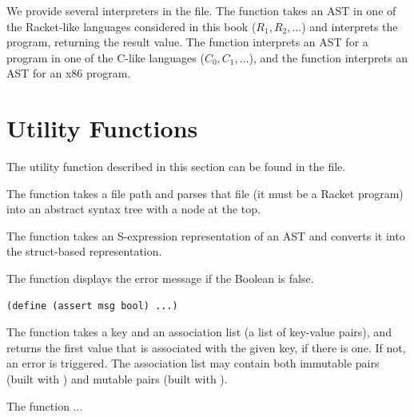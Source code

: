 \documentclass[11pt]{book}
\begin{document}
We provide several interpreters in the  file.  The
 function takes an AST in one of the Racket-like
languages considered in this book ($R_1, R_2, \ldots$) and interprets
the program, returning the result value.  The  function
interprets an AST for a program in one of the C-like languages ($C_0,
C_1, \ldots$), and the  function interprets an AST
for an x86 program.

\section{Utility Functions}
\label{appendix:utilities}

The utility function described in this section can be found in the
 file.

The  function takes a file path and parses that file
(it must be a Racket program) into an abstract syntax tree with a
 node at the top.

The  function takes an S-expression representation
of an AST and converts it into the struct-based representation.

The  function displays the error message  if the
Boolean  is false.
\begin{lstlisting}
(define (assert msg bool) ...)
\end{lstlisting}

The  function takes a key and an association list (a list
of key-value pairs), and returns the first value that is associated
with the given key, if there is one. If not, an error is triggered.
The association list may contain both immutable pairs (built with
) and mutable pairs (built with ).

The  function ...




\end{document}
